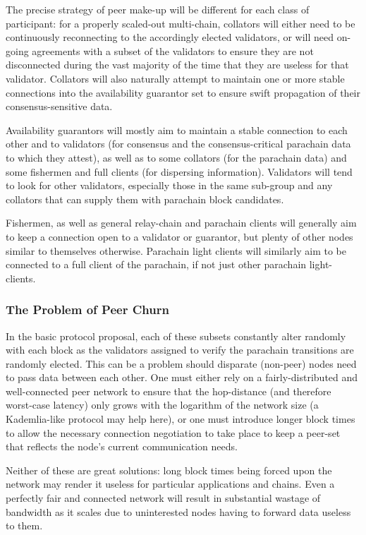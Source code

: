 \documentclass[9pt,oneside]{amsart}
\begin{document}
\begin{multicols}{2}
 The precise strategy of peer make-up will be different for each class of participant: for a properly scaled-out multi-chain, collators will either need to be continuously reconnecting to the accordingly elected validators, or will need on-going agreements with a subset of the validators to ensure they are not disconnected during the vast majority of the time that they are useless for that validator. Collators will also naturally attempt to maintain one or more stable connections into the availability guarantor set to ensure swift propagation of their consensus-sensitive data.

 Availability guarantors will mostly aim to maintain a stable connection to each other and to validators (for consensus and the consensus-critical parachain data to which they attest), as well as to some collators (for the parachain data) and some fishermen and full clients (for dispersing information). Validators will tend to look for other validators, especially those in the same sub-group and any collators that can supply them with parachain block candidates.

 Fishermen, as well as general relay-chain and parachain clients will generally aim to keep a connection open to a validator or guarantor, but plenty of other nodes similar to themselves otherwise. Parachain light clients will similarly aim to be connected to a full client of the parachain, if not just other parachain light-clients.

\subsubsection{The Problem of Peer Churn}
\label{the-problem-of-peer-churn}

 In the basic protocol proposal, each of these subsets constantly alter randomly with each block as the validators assigned to verify the parachain transitions are randomly elected. This can be a problem should disparate (non-peer) nodes need to pass data between each other. One must either rely on a fairly-distributed and well-connected peer network to ensure that the hop-distance (and therefore worst-case latency) only grows with the logarithm of the network size (a Kademlia-like protocol\cite{kademlia} may help here), or one must introduce longer block times to allow the necessary connection negotiation to take place to keep a peer-set that reflects the node's current communication needs.

 Neither of these are great solutions: long block times being forced upon the network may render it useless for particular applications and chains. Even a perfectly fair and connected network will result in substantial wastage of bandwidth as it scales due to uninterested nodes having to forward data useless to them.


\end{multicols}
\end{document}
